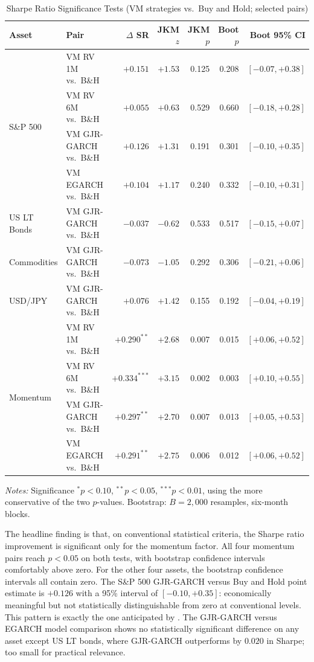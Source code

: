 \documentclass[12pt, a4paper]{article}
\begin{document}
\begin{table}[H]
\centering
\footnotesize
\caption{Sharpe Ratio Significance Tests (VM strategies vs.\ Buy and Hold; selected pairs)}
\label{tab:sigtest}
\begin{tabular}{llrrrrr}
\toprule
\textbf{Asset} & \textbf{Pair} & $\Delta$ SR & \textbf{JKM} $z$ & \textbf{JKM} $p$ & \textbf{Boot} $p$ & \textbf{Boot 95\% CI}\\
\midrule
\multirow{4}{*}{S\&P 500}
& VM RV 1M vs.\ B\&H     & $+0.151$ & $+1.53$ & 0.125 & 0.208 & $[-0.07,+0.38]$\\
& VM RV 6M vs.\ B\&H     & $+0.055$ & $+0.63$ & 0.529 & 0.660 & $[-0.18,+0.28]$\\
& VM GJR-GARCH vs.\ B\&H & $+0.126$ & $+1.31$ & 0.191 & 0.301 & $[-0.10,+0.35]$\\
& VM EGARCH vs.\ B\&H    & $+0.104$ & $+1.17$ & 0.240 & 0.332 & $[-0.10,+0.31]$\\
\midrule
US LT Bonds
& VM GJR-GARCH vs.\ B\&H & $-0.037$ & $-0.62$ & 0.533 & 0.517 & $[-0.15,+0.07]$\\
\midrule
Commodities
& VM GJR-GARCH vs.\ B\&H & $-0.073$ & $-1.05$ & 0.292 & 0.306 & $[-0.21,+0.06]$\\
\midrule
USD/JPY
& VM GJR-GARCH vs.\ B\&H & $+0.076$ & $+1.42$ & 0.155 & 0.192 & $[-0.04,+0.19]$\\
\midrule
\multirow{4}{*}{Momentum}
& VM RV 1M vs.\ B\&H     & $+0.290^{**}$  & $+2.68$ & 0.007 & 0.015 & $[+0.06,+0.52]$\\
& VM RV 6M vs.\ B\&H     & $+0.334^{***}$ & $+3.15$ & 0.002 & 0.003 & $[+0.10,+0.55]$\\
& VM GJR-GARCH vs.\ B\&H & $+0.297^{**}$  & $+2.70$ & 0.007 & 0.013 & $[+0.05,+0.53]$\\
& VM EGARCH vs.\ B\&H    & $+0.291^{**}$  & $+2.75$ & 0.006 & 0.012 & $[+0.06,+0.52]$\\
\bottomrule
\end{tabular}
\end{table}

\noindent\textit{Notes:} Significance $^*p<0.10$, $^{**}p<0.05$, $^{***}p<0.01$, using the more
conservative of the two $p$-values. Bootstrap: $B=2{,}000$ resamples, six-month blocks.

\noindent The headline finding is that, on conventional statistical criteria, the Sharpe
ratio improvement is significant only for the momentum factor. All four momentum pairs
reach $p<0.05$ on both tests, with bootstrap confidence intervals comfortably above zero.
For the other four assets, the bootstrap confidence intervals all contain zero. The S\&P
500 GJR-GARCH versus Buy and Hold point estimate is $+0.126$ with a 95\% interval of
$[-0.10,+0.35]$: economically meaningful but not statistically distinguishable from zero
at conventional levels. This pattern is exactly the one anticipated by \citet{liu2019}.
The GJR-GARCH versus EGARCH model comparison shows no statistically significant difference
on any asset except US LT bonds, where GJR-GARCH outperforms by $0.020$ in Sharpe; too
small for practical relevance.
\end{document}
